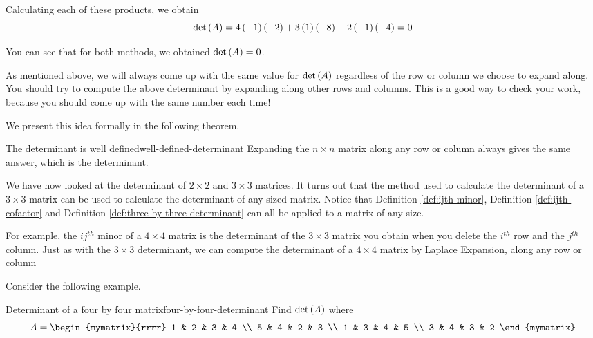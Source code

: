 \begin{solution}
Calculating each of these products, we obtain
\begin{equation*}
\det \left(A\right)
=
4\left(-1\right)\left(-2\right) 
+
3\left(1\right)\left(-8\right) 
+
2 \left(-1\right)\left(-4\right)
=
0
\end{equation*}

You can see that for both methods, we obtained $\det \left(A\right) = 0$. 
\end{solution}

As mentioned above, we will always come up with the same value for $\det \left(A\right)$ regardless of the row or column 
we choose to expand along. You should try to compute the above determinant by expanding along other
rows and columns. This is a good way to check your work, because you should come up 
with the same number each time!  

We present this idea formally in the following theorem.

\begin{theorem}{The determinant is well defined}{well-defined-determinant}
Expanding the $n\times n$ matrix along any row or column always gives the
same answer, which is the determinant.
\end{theorem}

We have now looked at the determinant of $2 \times 2$ and $3 \times 3$ matrices. It turns
out that the method used to calculate the determinant of a $3 \times 3$ matrix 
can be used to calculate the determinant of any sized matrix. Notice that
Definition \ref{def:ijth-minor}, Definition \ref{def:ijth-cofactor} and Definition \ref{def:three-by-three-determinant}
can all be applied to a matrix of any size. 

For example, the $ij^{th}$ minor of a $4 \times 4$ matrix is the determinant
of the $3 \times 3$ matrix you obtain when you delete the $i^{th}$ row and the $j^{th}$ column. 
Just as with the $3 \times 3$ determinant, we can compute the determinant of a $4 \times 4$ matrix by Laplace Expansion, 
along any row or column

Consider the following example. 

\begin{example}{Determinant of a four by four matrix}{four-by-four-determinant}
Find $\det \left(A\right) $ where
\begin{equation*}
A=\begin{mymatrix}{rrrr}
1 & 2 & 3 & 4 \\
5 & 4 & 2 & 3 \\
1 & 3 & 4 & 5 \\
3 & 4 & 3 & 2
\end{mymatrix}
\end{equation*}
\end{example}

